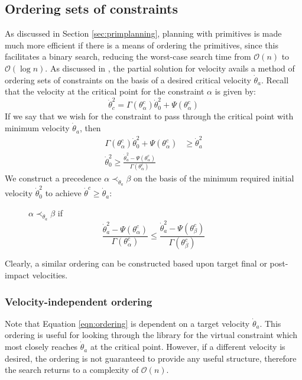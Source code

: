 \subsection{Ordering sets of constraints} \label{sec:orderings}
As discussed in Section \ref{sec:primplanning}, planning with primitives is made much more efficient if there is a means of ordering the primitives, since this facilitates a binary search, reducing the worst-case search time from $\mathcal{O}(n)$ to $\mathcal{O}(\log n)$. As discussed in \cite{manchester13planning}, the partial solution for velocity avails a method of ordering sets of constraints on the basis of a desired critical velocity $\dot{\theta}_a$. Recall that the velocity at the critical point for the constraint $\alpha$ is given by:
\[
	\dot{\theta}_c^2 = \Gamma(\theta_\alpha^c)\dot{\theta}_0^2 + \Psi(\theta_\alpha^c)
\]
If we say that we wish for the constraint to pass through the critical point with minimum velocity $\dot{\theta}_a$, then
\begin{align*}
	\Gamma(\theta_\alpha^c)\dot{\theta}_0^2 + \Psi(\theta_\alpha^c) &\geq \dot{\theta}_a^2 \\
	\dot{\theta}_0^2 \geq \frac{\dot{\theta}_a^2 - \Psi(\theta_\alpha^c)}{\Gamma(\theta_\alpha^c)}
\end{align*}
We construct a precedence $\alpha \prec_{\dot{\theta}_a} \beta$ on the basis of the minimum required initial velocity $\dot{\theta}_0^2$ to achieve $\dot{\theta}^c\geq\dot{\theta}_a$:

\begin{figure}[h]
\centering
$\alpha \prec_{\dot{\theta}_a} \beta$ if
\begin{equation} \label{eqn:ordering}
	\frac{\dot{\theta}_a^2 - \Psi(\theta_\alpha^c)}{\Gamma(\theta_\alpha^c)}
	\leq
	\frac{\dot{\theta}_a^2 - \Psi(\theta_\beta^c)}{\Gamma(\theta_\beta^c)}
\end{equation}
\end{figure}

Clearly, a similar ordering can be constructed based upon target final or post-impact velocities.

\subsubsection{Velocity-independent ordering}
Note that Equation \ref{eqn:ordering} is dependent on a target velocity $\dot{\theta}_a$. This ordering is useful for looking through the library for the virtual constraint which most closely reaches $\dot{\theta}_a$ at the critical point. However, if a different velocity is desired, the ordering is not guaranteed to provide any useful structure, therefore the search returns to a complexity of $\mathcal{O}(n)$.

